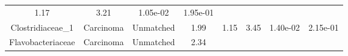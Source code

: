 \documentclass[12pt,]{article}
\begin{document}
\begin{longtable}[]{@{}cccccccc@{}}
\begin{minipage}[t]{0.13\columnwidth}
1.17\strut
\end{minipage} & \begin{minipage}[t]{0.13\columnwidth}\centering\strut
3.21\strut
\end{minipage} & \begin{minipage}[t]{0.07\columnwidth}\centering\strut
1.05e-02\strut
\end{minipage} & \begin{minipage}[t]{0.07\columnwidth}\centering\strut
1.95e-01\strut
\end{minipage}\tabularnewline
\begin{minipage}[t]{0.16\columnwidth}\centering\strut
Clostridiaceae\_1\strut
\end{minipage} & \begin{minipage}[t]{0.08\columnwidth}\centering\strut
Carcinoma\strut
\end{minipage} & \begin{minipage}[t]{0.09\columnwidth}\centering\strut
Unmatched\strut
\end{minipage} & \begin{minipage}[t]{0.05\columnwidth}\centering\strut
1.99\strut
\end{minipage} & \begin{minipage}[t]{0.13\columnwidth}\centering\strut
1.15\strut
\end{minipage} & \begin{minipage}[t]{0.13\columnwidth}\centering\strut
3.45\strut
\end{minipage} & \begin{minipage}[t]{0.07\columnwidth}\centering\strut
1.40e-02\strut
\end{minipage} & \begin{minipage}[t]{0.07\columnwidth}\centering\strut
2.15e-01\strut
\end{minipage}\tabularnewline
\begin{minipage}[t]{0.16\columnwidth}\centering\strut
Flavobacteriaceae\strut
\end{minipage} & \begin{minipage}[t]{0.08\columnwidth}\centering\strut
Carcinoma\strut
\end{minipage} & \begin{minipage}[t]{0.09\columnwidth}\centering\strut
Unmatched\strut
\end{minipage} & \begin{minipage}[t]{0.05\columnwidth}\centering\strut
2.34\strut
\end{minipage} & \begin{minipage}[t]{0.13\columnwidth}\centering\strut

\end{minipage}
\end{longtable}
\end{document}
